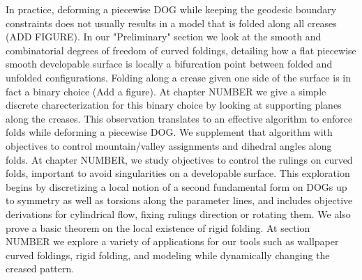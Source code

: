 In practice, deforming a piecewise DOG while keeping the geodesic boundary constraints does not usually results in a model that is folded along all creases (ADD FIGURE). In our "Preliminary" section we look at the smooth and combinatorial degrees of freedom of curved foldings, detailing how a flat piecewise smooth developable surface is locally a bifurcation point between folded and unfolded configurations. Folding along a crease given one side of the surface is in fact a binary choice (Add a figure). At chapter NUMBER we give a simple discrete charecterization for this binary choice by looking at supporting planes along the creases. This observation translates to an effective algorithm to enforce folds while deforming a piecewise DOG. We supplement that algorithm with objectives to control mountain/valley assignments and dihedral angles along folds. At chapter NUMBER, we study objectives to control the rulings on curved folds, important to avoid singularities on a developable surface. This exploration begins by discretizing a local notion of a second fundamental form on DOGs up to symmetry as well as torsions along the parameter lines, and includes objective derivations for cylindrical flow, fixing rulings direction or rotating them. We also prove a basic theorem on the local existence of rigid folding. At section NUMBER we explore a variety of applications for our tools such as wallpaper curved foldings, rigid folding, and modeling while dynamically changing the creased pattern.


